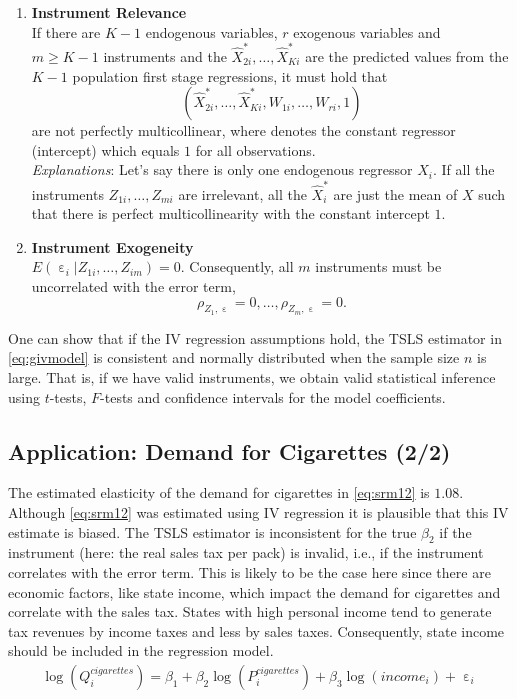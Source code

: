 \documentclass[
  14pt,
]{memoir}
\DeclareMathOperator{\eps}{\varepsilon}
\begin{document}
\begin{enumerate}
\item \textbf{Instrument Relevance}\\
If there are $K-1$ endogenous variables, $r$ exogenous variables and $m\geq K-1$ instruments and the $\widehat{X}_{2i}^*,\dots,\widehat{X}_{Ki}^*$ are the predicted values from the $K-1$ population first stage regressions, it must hold that $$(\widehat{X}_{2i}^*,\dots,\widehat{X}_{Ki}^*, W_{1i}, \dots, W_{ri},1)$$ are not perfectly multicollinear, where  denotes the constant regressor (intercept) which equals $1$ for all observations.\\
\textit{Explanations}:  Let's say there is only one endogenous regressor $X_i$. If all the instruments $Z_{1i},\dots,Z_{mi}$ are irrelevant, all the $\widehat{X}^*_i$ are just the mean of $X$ such that there is perfect multicollinearity with the constant intercept $1$.\\
\item \textbf{Instrument Exogeneity}\\
$E(\eps_i|Z_{1i},\dots,Z_{im})=0$. Consequently, all $m$ instruments must be uncorrelated with the error term, 
$$
\rho_{Z_{1},\eps} = 0,\dots,\rho_{Z_{m},\eps} = 0.
$$
\end{enumerate}

One can show that if the IV regression assumptions hold, the TSLS estimator in \eqref{eq:givmodel} is consistent and normally distributed when the sample size \(n\) is large. That is, if we have valid instruments, we obtain valid statistical inference using \(t\)-tests, \(F\)-tests and confidence intervals for the model coefficients.

\hypertarget{application-demand-for-cigarettes-22}{%
\subsection{Application: Demand for Cigarettes (2/2)}\label{application-demand-for-cigarettes-22}}

The estimated elasticity of the demand for cigarettes in \eqref{eq:srm12} is \(1.08\). Although \eqref{eq:srm12} was estimated using IV regression it is plausible that this IV estimate is biased. The TSLS estimator is inconsistent for the true \(\beta_2\) if the instrument (here: the real sales tax per pack) is invalid, i.e., if the instrument correlates with the error term. This is likely to be the case here since there are economic factors, like state income, which impact the demand for cigarettes and correlate with the sales tax. States with high personal income tend to generate tax revenues by income taxes and less by sales taxes. Consequently, state income should be included in the regression model.
\begin{align}
  \log(Q_i^{cigarettes}) = \beta_1 + \beta_2 \log(P_i^{cigarettes}) + \beta_3 \log(income_i) + \eps_i \label{eq:mcigstsls1}
\end{align}
\end{document}
